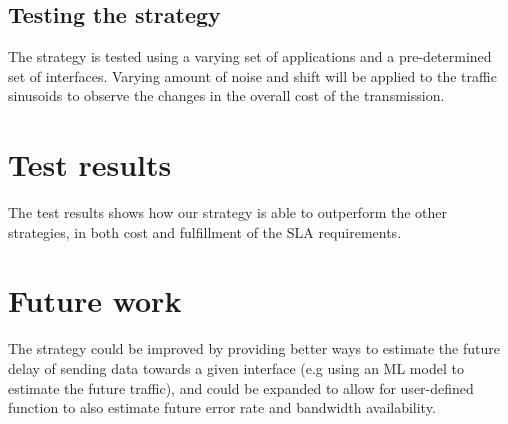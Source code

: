 \documentclass{article}
\begin{document}
	\subsection{Testing the strategy}
	The strategy is tested using a varying set of applications and a pre-determined set of interfaces. Varying amount of noise and shift will be applied to the traffic sinusoids to observe the changes in the overall cost of the transmission.
	
	\section{Test results}
	The test results shows how our strategy is able to outperform the other strategies, in both cost and fulfillment of the SLA requirements.
	
	\section{Future work}
	The strategy could be improved by providing better ways to estimate the future delay of sending data towards a given interface (e.g using an ML model to estimate the future traffic), and could be expanded to allow for user-defined function to also estimate future error rate and bandwidth availability.
	
	
	
	 
\end{document}

